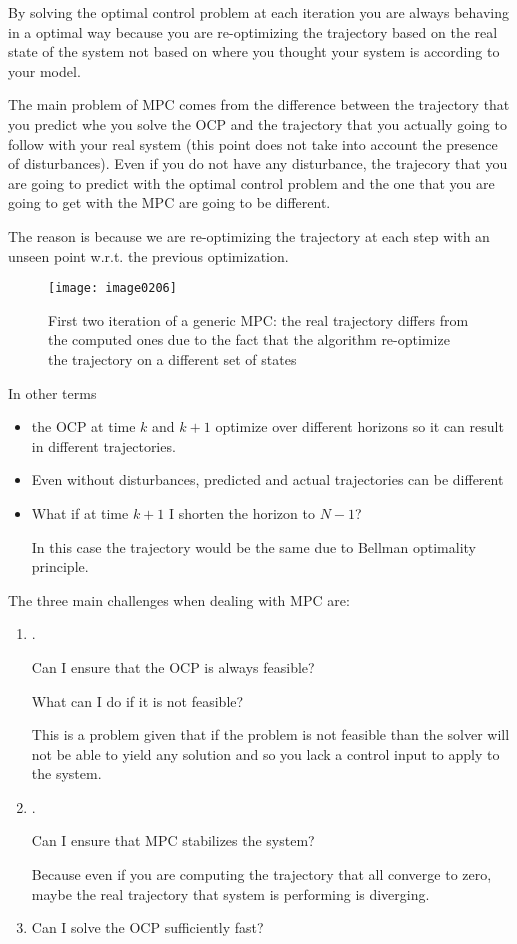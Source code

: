 By solving the optimal control problem at each iteration you are always behaving in a optimal way because you are re-optimizing the trajectory based on the real state of the system not based on where you thought your system is according to your model.

The main problem of MPC comes from the difference between the trajectory that you predict whe you solve the OCP and the trajectory that you actually going to follow with your real system (this point does not take into account the presence of disturbances). Even if you do not have any disturbance, the trajecory that you are going to predict with the optimal control problem and the one that you are going to get with the MPC are going to be different.

The reason is because we are re-optimizing the trajectory at each step with an unseen point w.r.t. the previous optimization.
\begin{figure}[!h]
\centering
\texttt{[image: image0206]}
\caption{First two iteration of a generic MPC: the real trajectory differs from the computed ones due to the fact that the algorithm re-optimize the trajectory on a different set of states}
\end{figure}

In other terms
\begin{itemize}
\item the OCP at time $k$ and $k+1$ optimize over different horizons so it can result in different trajectories.
\item Even without disturbances, predicted and actual trajectories can be different
\item What if at time $k+1$ I shorten the horizon to $N-1$? 

In this case the trajectory would be the same due to Bellman optimality principle.
\end{itemize}

The three main challenges when dealing with MPC are: 
\begin{enumerate}
\item {}.

Can I ensure that the OCP is always feasible?

What can I do if it is not feasible?

This is a problem given that if the problem is not feasible than the solver will not be able to yield any solution and so you lack a control input to apply to the system.
\item {}.

Can I ensure that MPC stabilizes the system?

Because even if you are computing the trajectory that all converge to zero, maybe the real trajectory that system is performing is diverging.
\item {}

Can I solve the OCP sufficiently fast?
\end{enumerate}

